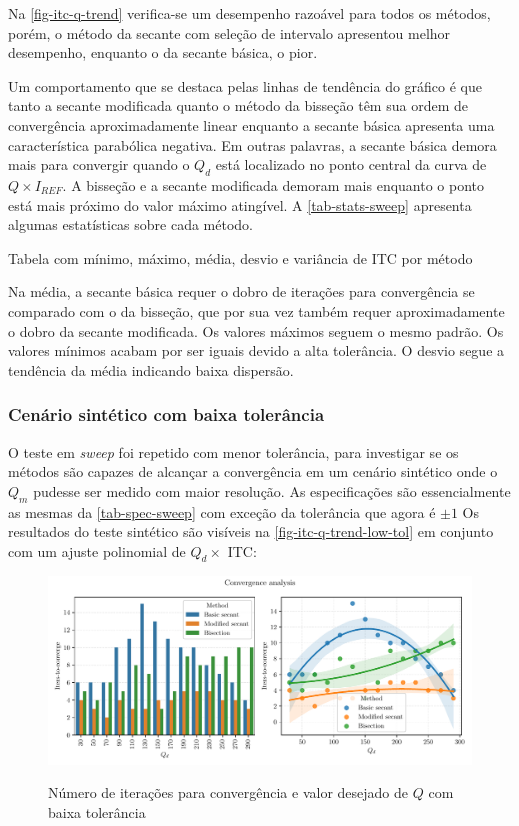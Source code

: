 Na \autoref{fig-itc-q-trend} verifica-se um desempenho razoável para todos os métodos, porém, o método da secante com seleção de intervalo apresentou melhor desempenho, enquanto o da secante básica, o pior.

Um comportamento que se destaca pelas linhas de tendência do gráfico é que tanto a secante modificada quanto o método da bisseção têm sua ordem de convergência aproximadamente linear enquanto a secante básica apresenta uma característica parabólica negativa. Em outras palavras, a secante básica demora mais para convergir quando o $Q_d$ está localizado no ponto central da curva de $Q \times I_{REF}$. A bisseção e a secante modificada demoram mais enquanto o ponto está mais próximo do valor máximo atingível. A \autoref{tab-stats-sweep} apresenta algumas estatísticas sobre cada método.

\begin{table}[H]
    \centering
    \caption{Tabela com mínimo, máximo, média, desvio e variância de ITC por método}
        
    \label{tab-stats-sweep}
\end{table}

Na média, a secante básica requer o dobro de iterações para convergência se comparado com o da bisseção, que por sua vez também requer aproximadamente o dobro da secante modificada. Os valores máximos seguem o mesmo padrão. Os valores mínimos acabam por ser iguais devido a alta tolerância. O desvio segue a tendência da média indicando baixa dispersão.


\subsubsection{Cenário sintético com baixa tolerância}

O teste em \textit{sweep} foi repetido com menor tolerância, para investigar se os métodos são capazes de alcançar a convergência em um cenário sintético onde o $Q_m$ pudesse ser medido com maior resolução. As especificações são essencialmente as mesmas da \autoref{tab-spec-sweep} com exceção da tolerância que agora é $\pm 1$
Os resultados do teste sintético são visíveis na \autoref{fig-itc-q-trend-low-tol} em conjunto com um ajuste polinomial de $Q_d \times$ ITC:

\begin{figure}[H]
    \centering
    \caption{Número de iterações para convergência e valor desejado de $Q$ com baixa tolerância}
    \includegraphics{fig/conv-analysis-no-drop-low-tol.pdf}
    \label{fig-itc-q-trend-low-tol}
\end{figure}

